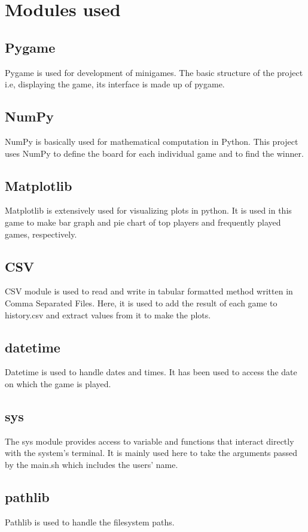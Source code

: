 \documentclass{article}
\begin{document}
\section{Modules used}
\subsection{Pygame}
Pygame is used for development of minigames. The basic structure of the project i.e, displaying the game, its interface is made up of pygame.

\subsection{NumPy}
NumPy is basically used for mathematical computation in Python. This project uses NumPy to define the board for each individual game and to find the winner.

\subsection{Matplotlib}
Matplotlib is extensively used for visualizing plots in python. It is used in this game to make bar graph and pie chart of top players and frequently played games, respectively.

\subsection{CSV}
CSV module is used to read and write in tabular formatted method written in Comma Separated Files. Here, it is used to add the result of each game to history.csv and extract values from it to make the plots.

\subsection{datetime}
Datetime is used to handle dates and times. It has been used to access the date on which the game is played.

\subsection{sys}
The sys module provides access to variable and functions that interact directly with the system's terminal. It is mainly used here to take the arguments passed by the main.sh which includes the users' name.

\subsection{pathlib}
Pathlib is used to handle the filesystem paths.
\end{document}
